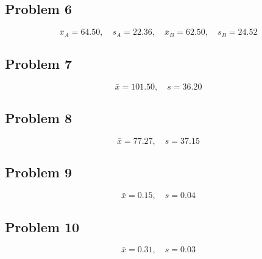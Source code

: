 \subsection*{Problem 6}
\[
\bar{x}_A=64.50,\quad s_A=22.36,\quad \bar{x}_B=62.50,\quad s_B=24.52
\]

\subsection*{Problem 7}
\[
\bar{x}=101.50,\quad s=36.20
\]

\subsection*{Problem 8}
\[
\bar{x}=77.27,\quad s=37.15
\]

\subsection*{Problem 9}
\[
\bar{x}=0.15,\quad s=0.04
\]

\subsection*{Problem 10}
\[
\bar{x}=0.31,\quad s=0.03
\]



